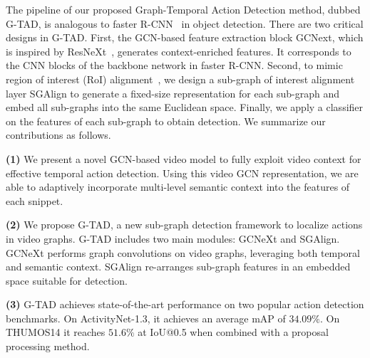 \documentclass[10pt,twocolumn,letterpaper]{article}
\begin{document}
The pipeline of our proposed Graph-Temporal Action Detection method, dubbed  G-TAD, is analogous to faster R-CNN~\cite{girshick2015fast, ren2015faster} in object detection. There are two critical designs in G-TAD. First, the GCN-based feature extraction block GCNext, which is inspired by ResNeXt~\cite{xie2017aggregated},  generates context-enriched features. It corresponds to the CNN blocks of the backbone network in faster R-CNN. Second, to mimic region of interest (RoI) alignment~\cite{he2017mask}, we design a sub-graph of interest alignment layer SGAlign to generate a fixed-size representation for each sub-graph and embed all sub-graphs into the same Euclidean space. Finally, we apply a classifier on the features of each sub-graph to obtain detection.  We summarize our contributions as follows.






































\noindent
\textbf{(1)}  We present a novel GCN-based video model to fully exploit video context for effective temporal action detection. Using this video GCN representation, we are able to adaptively incorporate multi-level semantic context into the features of each snippet.

\noindent
\textbf{(2)} We propose G-TAD, a new sub-graph detection framework to localize actions in video graphs. G-TAD includes two main modules: GCNeXt and SGAlign. GCNeXt performs graph convolutions on video graphs, leveraging both temporal and semantic context. SGAlign re-arranges sub-graph features in an embedded space suitable for detection.


\noindent
\textbf{(3)} G-TAD achieves state-of-the-art performance on two popular action detection benchmarks. On ActivityNet-1.3, it achieves an average mAP of $34.09\%$. On THUMOS14 it reaches $51.6\%$ at IoU@0.5 when combined with a proposal processing method. 
\end{document}
